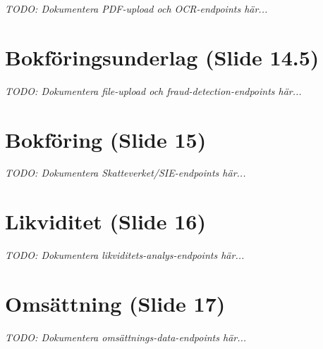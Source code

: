 \documentclass[12pt,a4paper]{article}
\begin{document}
\textit{TODO: Dokumentera PDF-upload och OCR-endpoints här...}

\newpage


\section{Bokföringsunderlag (Slide 14.5)}

\textit{TODO: Dokumentera file-upload och fraud-detection-endpoints här...}

\newpage


\section{Bokföring (Slide 15)}

\textit{TODO: Dokumentera Skatteverket/SIE-endpoints här...}

\newpage


\section{Likviditet (Slide 16)}

\textit{TODO: Dokumentera likviditets-analys-endpoints här...}

\newpage


\section{Omsättning (Slide 17)}

\textit{TODO: Dokumentera omsättnings-data-endpoints här...}

\newpage
\end{document}
